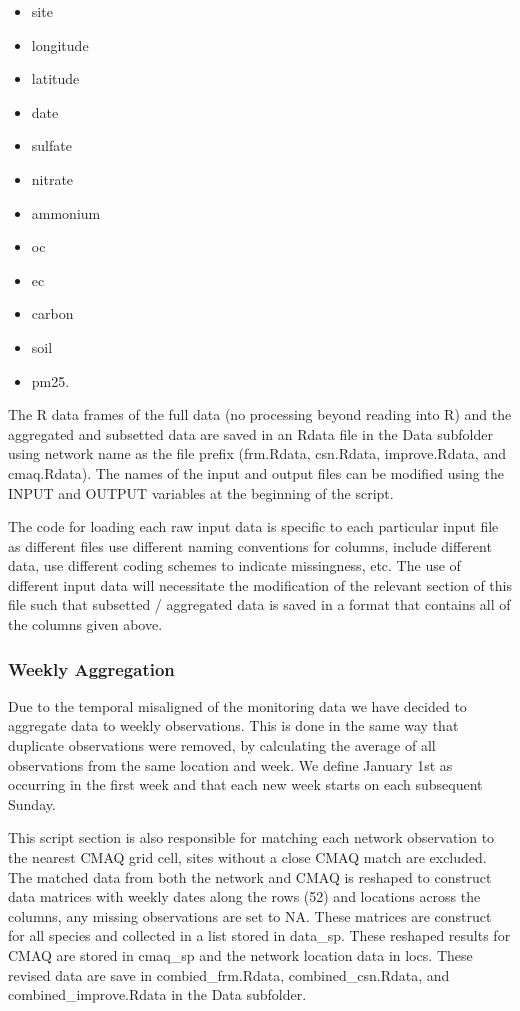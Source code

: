 \documentclass[11pt]{article}
\begin{document}
\begin{multicols}{3}
\begin{itemize}
\item site
\item longitude
\item latitude
\item date
\item sulfate
\item nitrate
\item ammonium
\item oc
\item ec
\item carbon
\item soil
\item pm25.
\end{itemize}
\end{multicols}

The R data frames of the full data (no processing beyond reading into R) and the aggregated and subsetted data are saved in an Rdata file in the Data subfolder using network name as the file prefix (frm.Rdata, csn.Rdata, improve.Rdata, and cmaq.Rdata). The names of the input and output files can be modified using the INPUT and OUTPUT variables at the beginning of the script. 

The code for loading each raw input data is specific to each particular input file as different files use different naming conventions for columns, include different data, use different coding schemes to indicate missingness, etc. The use of different input data will necessitate the modification of the relevant section of this file such that subsetted / aggregated data is saved in a format that contains all of the columns given above.


\subsubsection{Weekly Aggregation}

Due to the temporal misaligned of the monitoring data we have decided to aggregate data to weekly observations. This is done in the same way that duplicate observations were removed, by calculating the average of all observations from the same location and week. We define January 1st as occurring in the first week and that each new week starts on each subsequent Sunday.

This script section is also responsible for matching each network observation to the nearest CMAQ grid cell, sites without a close CMAQ match are excluded. The matched data from both the network and CMAQ is reshaped to construct data matrices with weekly dates along the rows (52) and locations across the columns, any missing observations are set to NA. These matrices are construct for all species and collected in a list stored in data\_sp. These reshaped results for CMAQ are stored in cmaq\_sp and the network location data in locs. These revised data are save in combied\_frm.Rdata, combined\_csn.Rdata, and combined\_improve.Rdata in the Data subfolder.
\end{document}
